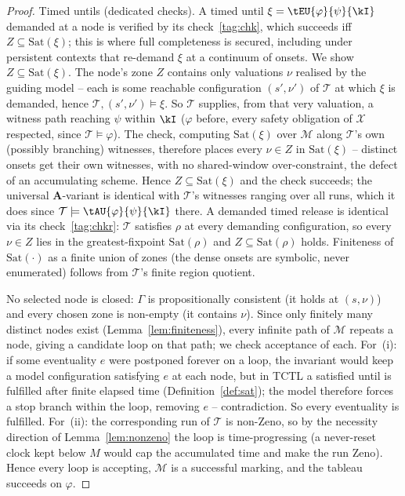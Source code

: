 \begin{proof}
{Timed untils (dedicated checks).} A timed until $\xi=\tEU{\varphi}{\psi}{\kI}$ demanded at a node is verified by its check~\eqref{tag:chk}, which succeeds iff $Z\subseteq\mathrm{Sat}(\xi)$; this is where full completeness is secured, including under persistent contexts that re-demand $\xi$ at a continuum of onsets. We show $Z\subseteq\mathrm{Sat}(\xi)$. The node's zone $Z$ contains only valuations $\nu$ realised by the guiding model -- each is some reachable configuration $(s',\nu')$ of $\mathcal{T}$ at which $\xi$ is demanded, hence $\mathcal{T},(s',\nu')\models\xi$. So $\mathcal{T}$ supplies, {from that very valuation}, a witness path reaching $\psi$ within $\kI$ ($\varphi$ before, every safety obligation of $\mathcal{X}$ respected, since $\mathcal{T}\models\varphi$). The check, computing $\mathrm{Sat}(\xi)$ over $\mathcal{M}$ along $\mathcal{T}$'s own (possibly branching) witnesses, therefore places {every} $\nu\in Z$ in $\mathrm{Sat}(\xi)$ -- distinct onsets get their own witnesses, with no shared-window over-constraint, the defect of an accumulating scheme. Hence $Z\subseteq\mathrm{Sat}(\xi)$ and the check succeeds; the universal $\mathbf{A}$-variant is identical with $\mathcal{T}$'s witnesses ranging over all runs, which it does since $\mathcal{T}\models\tAU{\varphi}{\psi}{\kI}$ there. A demanded timed {release} is identical via its check~\eqref{tag:chkr}: $\mathcal{T}$ satisfies $\rho$ at every demanding configuration, so every $\nu\in Z$ lies in the greatest-fixpoint $\mathrm{Sat}(\rho)$ and $Z\subseteq\mathrm{Sat}(\rho)$ holds. Finiteness of $\mathrm{Sat}(\cdot)$ as a finite union of zones (the dense onsets are symbolic, never enumerated) follows from $\mathcal{T}$'s finite region quotient.

No selected node is closed: $\Gamma$ is propositionally consistent (it holds at $(s,\nu)$) and every chosen zone is non-empty (it contains $\nu$). Since only finitely many distinct nodes exist (Lemma~\ref{lem:finiteness}), every infinite path of $\mathcal{M}$ repeats a node, giving a candidate loop on that path; we check acceptance of each. For~(i): if some eventuality $e$ were postponed forever on a loop, the invariant would keep a model configuration satisfying $e$ at each node, but in TCTL a satisfied until is fulfilled after finite elapsed time (Definition~\ref{def:sat}); the model therefore forces a stop branch within the loop, removing $e$ -- contradiction. So every eventuality is fulfilled. For~(ii): the corresponding run of $\mathcal{T}$ is non-Zeno, so by the necessity direction of Lemma~\ref{lem:nonzeno} the loop is time-progressing (a never-reset clock kept below $M$ would cap the accumulated time and make the run Zeno). Hence every loop is accepting, $\mathcal{M}$ is a successful marking, and the tableau succeeds on $\varphi$.
\end{proof}

